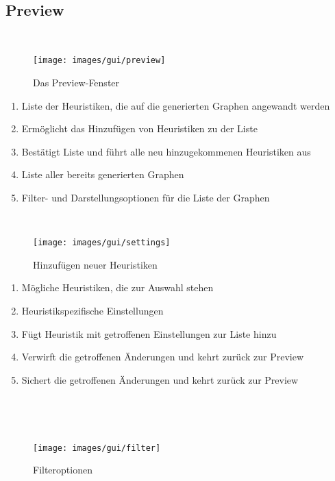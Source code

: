 \documentclass{article}
\begin{document}
	
	
	
	~\newpage
	\subsection{Preview}
	~\begin{figure}[!h]
		\centering
		\texttt{[image: images/gui/preview]}
		\caption{Das Preview-Fenster}
	\end{figure}
	
	\FloatBarrier
	
	\begin{enumerate}[(1)]
		\item{Liste der Heuristiken, die auf die generierten Graphen angewandt werden}
		\item{Ermöglicht das Hinzufügen von Heuristiken zu der Liste}
		\item{Bestätigt Liste und führt alle neu hinzugekommenen Heuristiken aus}
		\item{Liste aller bereits generierten Graphen}
		\item{Filter- und Darstellungsoptionen für die Liste der Graphen}
	\end{enumerate}
	
	
	~\begin{figure}[!h]
		\centering
		\texttt{[image: images/gui/settings]}
		\caption{Hinzufügen neuer Heuristiken}
	\end{figure}
	
	\FloatBarrier
	
	\begin{enumerate}[(1)]
		\item{Mögliche Heuristiken, die zur Auswahl stehen}
		\item{Heuristikspezifische Einstellungen}
		\item{Fügt Heuristik mit getroffenen Einstellungen zur Liste hinzu}
		\item{Verwirft die getroffenen Änderungen und kehrt zurück zur Preview}
		\item{Sichert die getroffenen Änderungen und kehrt zurück zur Preview}
	\end{enumerate}
	
	
	~\newpage
	
	~\begin{figure}[!h]
		\centering
		\texttt{[image: images/gui/filter]}
		\caption{Filteroptionen}
	\end{figure}
	
	\FloatBarrier
	
\end{document}
